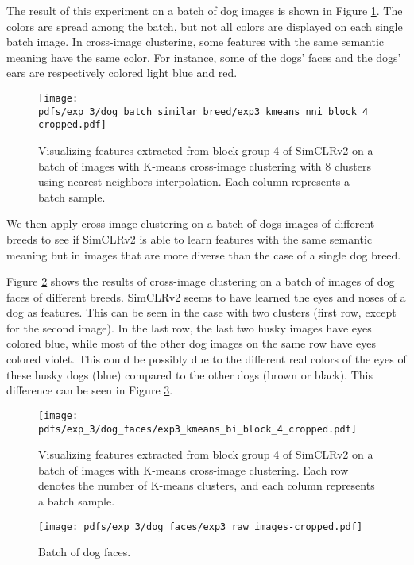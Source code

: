         The result of this experiment on a batch of dog images is shown in Figure \ref{fig:exp_3_kmeans_bi_all_dogs_similar_breed}. The colors are spread among the batch, but not all colors are displayed on each single batch image.
        In cross-image clustering, some features with the same semantic meaning have the same color. For instance, some of the dogs' faces and the dogs' ears are respectively colored light blue and red.
        \begin{figure}[H]
            \centering
            \texttt{[image: pdfs/exp\_3/dog\_batch\_similar\_breed/exp3\_kmeans\_nni\_block\_4\_cropped.pdf]}
            \caption{Visualizing features extracted from block group 4 of SimCLRv2 on a batch of images with K-means cross-image clustering with 8 clusters using nearest-neighbors interpolation. Each column represents a batch sample.}
            \label{fig:exp_3_kmeans_bi_all_dogs_similar_breed}
        \end{figure}
        
        
        We then apply cross-image clustering on a batch of dogs images of different breeds to see if SimCLRv2 is able to learn features with the same semantic meaning but in images that are more diverse than the case of a single dog breed.
        
        Figure \ref{fig:exp_3_kmeans_bi_dog_faces} shows the results of cross-image clustering on a batch of images of dog faces of different breeds. SimCLRv2 seems to have learned the eyes and noses of a dog as features. This can be seen in the case with two clusters (first row, except for the second image).
        In the last row, the last two husky images have eyes colored blue, while most of the other dog images on the same row have eyes colored violet. This could be possibly due to the different real colors of the eyes of these husky dogs (blue) compared to the other dogs (brown or black). This difference can be seen in Figure \ref{fig:exp_3_raw_images_dog_faces}.
        
        \begin{figure}[H]
            \centering
            \texttt{[image: pdfs/exp\_3/dog\_faces/exp3\_kmeans\_bi\_block\_4\_cropped.pdf]}
            \caption{Visualizing features extracted from block group 4 of SimCLRv2 on a batch of images with K-means cross-image clustering. Each row denotes the number of K-means clusters, and each column represents a batch sample.}
            \label{fig:exp_3_kmeans_bi_dog_faces}
        \end{figure}        
        \begin{figure}[H]
            \centering
            \texttt{[image: pdfs/exp\_3/dog\_faces/exp3\_raw\_images-cropped.pdf]}
            \caption{Batch of dog faces.}
            \label{fig:exp_3_raw_images_dog_faces}
        \end{figure}

